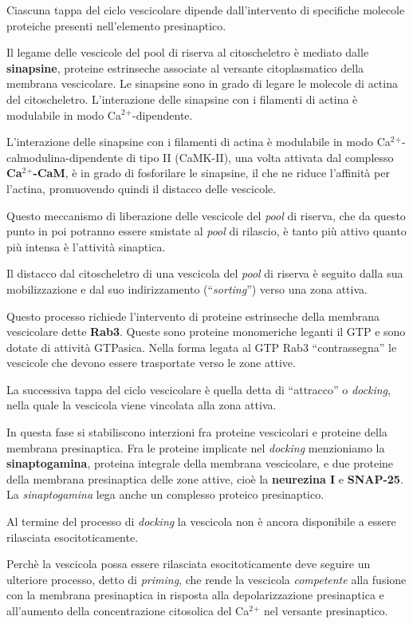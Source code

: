 \documentclass[]{article}
\begin{document}
Ciascuna tappa del ciclo vescicolare dipende dall'intervento di
specifiche molecole proteiche presenti nell'elemento presinaptico.

Il legame delle vescicole del pool di riserva al citoscheletro è mediato
dalle \textbf{sinapsine}, proteine estrinseche associate al versante
citoplasmatico della membrana vescicolare. Le sinapsine sono in grado di
legare le molecole di actina del citoscheletro. L'interazione delle
sinapsine con i filamenti di actina è modulabile in modo
Ca\(^2\)\(^+\)-dipendente.

L'interazione delle sinapsine con i filamenti di actina è modulabile in
modo Ca\(^2\)\(^+\)-calmodulina-dipendente di tipo II (CaMK-II), una
volta attivata dal complesso \textbf{Ca\(^2\)\(^+\)-CaM}, è in grado di
fosforilare le sinapsine, il che ne riduce l'affinità per l'actina,
promuovendo quindi il distacco delle vescicole.

Questo meccanismo di liberazione delle vescicole del \emph{pool} di
riserva, che da questo punto in poi potranno essere smistate al
\emph{pool} di rilascio, è tanto più attivo quanto più intensa è
l'attività sinaptica.

Il distacco dal citoscheletro di una vescicola del \emph{pool} di
riserva è seguito dalla sua mobilizzazione e dal suo indirizzamento
(``\emph{sorting}'') verso una zona attiva.

Questo processo richiede l'intervento di proteine estrinseche della
membrana vescicolare dette \textbf{Rab3}. Queste sono proteine
monomeriche leganti il GTP e sono dotate di attività GTPasica. Nella
forma legata al GTP Rab3 ``contrassegna'' le vescicole che devono essere
trasportate verso le zone attive.

La successiva tappa del ciclo vescicolare è quella detta di ``attracco''
o \emph{docking}, nella quale la vescicola viene vincolata alla zona
attiva.

In questa fase si stabiliscono interzioni fra proteine vescicolari e
proteine della membrana presinaptica. Fra le proteine implicate nel
\emph{docking} menzioniamo la \textbf{sinaptogamina}, proteina integrale
della membrana vescicolare, e due proteine della membrana presinaptica
delle zone attive, cioè la \textbf{neurezina I} e \textbf{SNAP-25}. La
\emph{sinaptogamina} lega anche un complesso proteico presinaptico.

Al termine del processo di \emph{docking} la vescicola non è ancora
disponibile a essere rilasciata esocitoticamente.

Perchè la vescicola possa essere rilasciata esocitoticamente deve
seguire un ulteriore processo, detto di \emph{priming}, che rende la
vescicola \emph{competente} alla fusione con la membrana presinaptica in
risposta alla depolarizzazione presinaptica e all'aumento della
concentrazione citosolica del Ca\(^2\)\(^+\) nel versante presinaptico.
\end{document}
